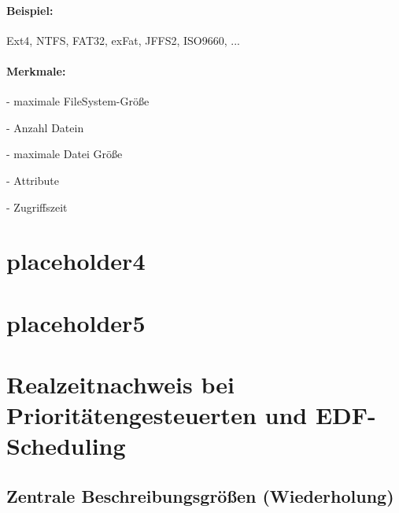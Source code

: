 \documentclass[12pt,a4paper,oneside,ngerman]{article}
\begin{document}
\paragraph{Beispiel:} Ext4, NTFS, FAT32, exFat, JFFS2, ISO9660, ...\\

\paragraph{Merkmale:}
\begin{description}
	\item - maximale FileSystem-Größe
	\item - Anzahl Datein
	\item - maximale Datei Größe
	\item - Attribute
	\item - Zugriffszeit
\end{description}

\section[placeholder4]{placeholder4}
\section[placeholder5]{placeholder5}

\section[Realzeitnachweis]{Realzeitnachweis bei Prioritätengesteuerten und EDF-Scheduling}
\subsection{Zentrale Beschreibungsgrößen (Wiederholung)}

\end{document}
